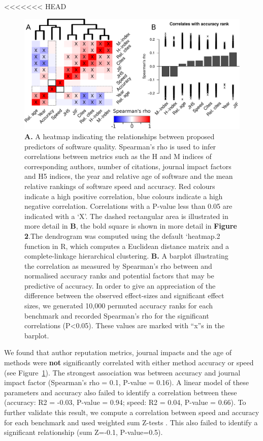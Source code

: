 \documentclass[fleqn,10pt]{SelfArx} %
\begin{document}
<<<<<<< HEAD
\begin{figure}[h]
\includegraphics[width=\textwidth]{figure1.pdf}
\caption{\textbf{A.} A heatmap indicating the relationships between proposed predictors of software quality. Spearman’s rho is used to infer correlations between metrics such as the H and M indices of corresponding authors, number of citations, journal impact factors and H5 indices, the year and relative age of software and the mean relative rankings of software speed and accuracy. Red colours indicate a high positive correlation, blue colours indicate a high negative correlation. Correlations with a P-value less than 0.05 are indicated with a ‘X’. The dashed rectangular area is illustrated in more detail in \textbf{B}, the bold square is shown in more detail in \textbf{Figure 2}.The dendrogram was computed using the default ‘heatmap.2 function in R, which computes a Euclidean distance matrix and a complete-linkage hierarchical clustering. \textbf{B.} A barplot illustrating the correlation as measured by Spearman’s rho between and normalised accuracy ranks and potential factors that may be predictive of accuracy. In order to give an appreciation of the difference between the observed effect-sizes and significant effect sizes, we generated 10,000 permuted accuracy ranks for each benchmark and recorded Spearman’s rho for the significant correlations (P<0.05). These values are marked with “x”s in the barplot.}
\label{fig:allfactors}
\end{figure}


We found that author reputation metrics, journal impacts and the age of methods were \textbf{not} significantly correlated with either method accuracy or speed (see Figure~\ref{fig:allfactors}). The strongest association was between accuracy and journal impact factor (Spearman’s rho = 0.1, P-value = 0.16). A linear model of these parameters and accuracy also failed to identify a correlation between these (accuracy: R2 = -0.03, P-value = 0.94; speed: R2 = 0.04, P-value = 0.66). To further validate this result, we compute a correlation between speed and accuracy for each benchmark and used weighted sum Z-tests \cite{Zaykin2011-tj}. This also failed to identify a significant relationship (sum Z=-0.1, P-value=0.5).
\end{document}
